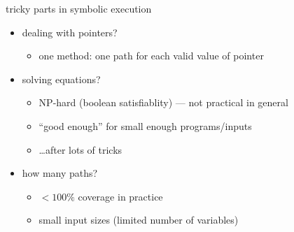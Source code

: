 
\begin{frame}{tricky parts in symbolic execution}
    \begin{itemize}
    \item dealing with pointers?
        \begin{itemize}
        \item one method: one path for each valid value of pointer
        \end{itemize}
    \item solving equations?
        \begin{itemize}
        \item NP-hard (boolean satisfiablity) --- not practical in general
        \item ``good enough'' for small enough programs/inputs
        \item \ldots after lots of tricks
        \end{itemize}
    \item how many paths?
        \begin{itemize}
        \item $<100\%$ coverage in practice
        \item small input sizes (limited number of variables)
        \end{itemize}
    \end{itemize}
\end{frame}


